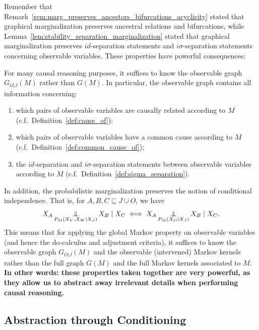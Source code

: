 Remember that Remark~\ref{rem:marg_preserves_ancestors_bifurcations_acyclicity} stated that graphical marginalization
preserves ancestral relations and bifurcations, while 
Lemma~\ref{lem:stability_separation_marginalization} stated that graphical marginalization preserves
$id$-separation statements and $i\sigma$-separation statements concerning observable variables.
These properties have powerful consequences:
\begin{Rem}
For many causal reasoning purposes, it suffices to know the observable graph $G_{O|J}(M)$ rather than $G(M)$.
In particular, the observable graph contains all information concerning:
  \begin{enumerate}
    \item which pairs of observable variables are causally related according to $M$ (c.f.\ Definition~\ref{def:cause_of});
    \item which pairs of observable variables have a common cause according to $M$ (c.f.\ Definition~\ref{def:common_cause_of});
    \item the $id$-separation and $i\sigma$-separation statements between observable variables according to $M$ (c.f.\ Definition~\ref{def:sigma_separation}).
  \end{enumerate}
\end{Rem}
In addition, the probabilistic marginalization preserves the notion of conditional independence. That is,
for $A, B, C \subseteq J \cup O$, we have
  $$X_A \operatorname*{\perp\mkern-11mu\perp}_{P_{M}(X_V,X_W \mid X_J)} X_B \mid X_C \iff X_A \operatorname*{\perp\mkern-11mu\perp}_{P_{M}(X_O \mid X_J)} X_B \mid X_C.$$
This means that for applying the global Markov property on observable variables (and hence the do-calculus 
and adjustment criteria), it suffices to know the observable graph $G_{O|J}(M)$ and the observable (intervened) 
Markov kernels rather than the full graph $G(M)$ and the full Markov kernels associated to $M$.
\textbf{In other words: these properties taken together are very powerful, as they allow us to abstract away irrelevant details when performing causal reasoning.}

\subsection{Abstraction through Conditioning}

